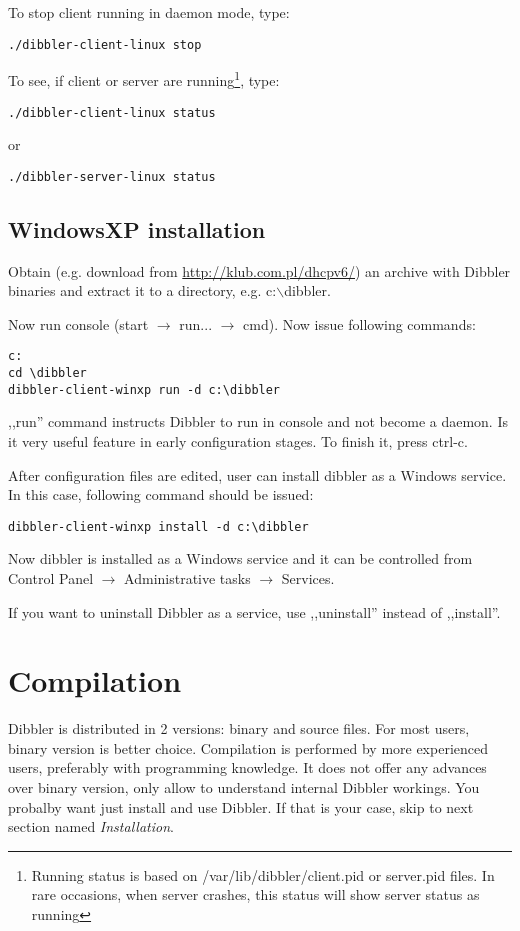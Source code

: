 To stop client running in daemon mode, type:
\begin{verbatim}
./dibbler-client-linux stop
\end{verbatim}

To see, if client or server are running\footnote{Running status is
  based on /var/lib/dibbler/client.pid or server.pid files. In rare
  occasions, when server crashes, this status will show server status as running}, type:
\begin{verbatim}
./dibbler-client-linux status
\end{verbatim}

or
\begin{verbatim}
./dibbler-server-linux status
\end{verbatim}

\subsection{WindowsXP installation}
Obtain (e.g. download from \url{http://klub.com.pl/dhcpv6/}) an archive with
Dibbler binaries and extract it to a directory, e.g. c:$\backslash$dibbler.

Now run console (start $\rightarrow$ run... $\rightarrow$ cmd). Now
issue following commands:

\begin{verbatim}
c:
cd \dibbler
dibbler-client-winxp run -d c:\dibbler
\end{verbatim}

,,run'' command instructs Dibbler to run in console and not become a
daemon. Is it very useful feature in early configuration stages. To
finish it, press ctrl-c. 

After configuration files are edited, user can install dibbler as a
Windows service. In this case, following command should be issued:
\begin{verbatim}
dibbler-client-winxp install -d c:\dibbler
\end{verbatim}

Now dibbler is installed as a Windows service and it can be controlled
from Control Panel $\rightarrow$ Administrative tasks $\rightarrow$
Services. 

If you want to uninstall Dibbler as a service, use ,,uninstall''
instead of ,,install''.

\section{Compilation}
Dibbler is distributed in 2 versions: binary and source files. For
most users, binary version is better choice.  Compilation is
performed by more experienced users, preferably with programming
knowledge. It does not offer any advances over binary version, only
allow to understand internal Dibbler workings. You probalby want just
install and use Dibbler. If that is your case, skip to next section
named \emph{Installation}.

